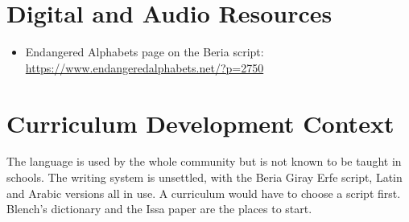 \documentclass[12pt]{article}
\begin{document}
\section{Digital and Audio Resources}
\begin{itemize}
\item Endangered Alphabets page on the Beria script: \url{https://www.endangeredalphabets.net/?p=2750}
\end{itemize}

\section{Curriculum Development Context}
The language is used by the whole community but is not known to be taught in schools. The writing system is unsettled, with the Beria Giray Erfe script, Latin and Arabic versions all in use. A curriculum would have to choose a script first. Blench's dictionary and the Issa paper are the places to start.
\end{document}
